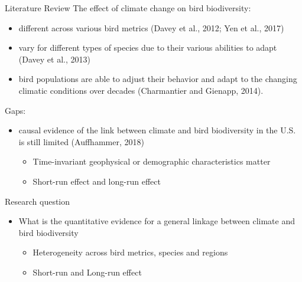 \documentclass[handout]{beamer}
\begin{document}
\begin{frame}{Literature Review}
  The effect of climate change on bird biodiversity:
\begin{itemize}
  \item different across various bird metrics (Davey et al., 2012; Yen et al., 2017)
  \item vary for different types of species due to their various abilities to adapt (Davey et al., 2013)
  \item bird populations are able to adjust their behavior and adapt to the changing climatic conditions over decades (Charmantier and Gienapp, 2014).
\end{itemize}
Gaps:
\begin{itemize}
  \item causal evidence of the link between climate and bird biodiversity in the U.S. is still limited (Auffhammer, 2018)
  \begin{itemize}
    \item Time-invariant geophysical or demographic characteristics matter
    \item Short-run effect and long-run effect
  \end{itemize}
\end{itemize}
\end{frame}


\begin{frame}{Research question}
  \begin{itemize}
    \item What is the quantitative evidence for a general linkage between climate and bird biodiversity
    \begin{itemize}
      \item Heterogeneity across bird metrics, species and regions
      \item Short-run and Long-run effect
    \end{itemize}
  \end{itemize}
\end{frame}
\end{document}
